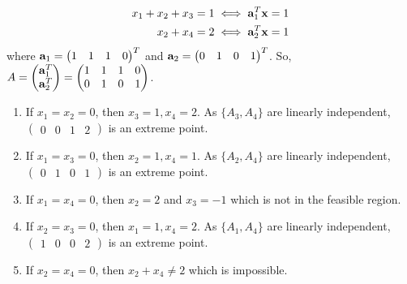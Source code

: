 \begin{enumerate}
\begin{enumerate}[label=(\alph*)]
                    \begin{align*}
                        x_1 + x_2 + x_3 = 1 & \iff \mathbf{a}_1^T \mathbf{x} = 1 \\
                        x_2 + x_4 = 2       & \iff \mathbf{a}_2^T \mathbf{x} = 1
                    \end{align*}
                    where \(\mathbf{a}_1 = \begin{pmatrix}
                        1 & 1 & 1 & 0
                    \end{pmatrix}^T\) and \(\mathbf{a}_2 = \begin{pmatrix}
                        0 & 1 & 0 & 1
                    \end{pmatrix}^T\). So, \(A = \begin{pmatrix}
                        \mathbf{a}_1^T \\ \mathbf{a}_2^T
                    \end{pmatrix} = \begin{pmatrix}
                        1 & 1 & 1 & 0 \\
                        0 & 1 & 0 & 1
                    \end{pmatrix}\).
                    \begin{enumerate}
                        \item If \(x_1 = x_2 = 0\), then \(x_3 = 1, x_4 = 2\). As \(\{A_3, A_4\}\) are linearly independent, \(\begin{pmatrix}
                                  0 & 0 & 1 & 2
                              \end{pmatrix}\) is an extreme point.
                        \item If \(x_1 = x_3 = 0\), then \(x_2 = 1, x_4 = 1\). As \(\{A_2, A_4\}\) are linearly independent, \(\begin{pmatrix}
                                  0 & 1 & 0 & 1
                              \end{pmatrix}\) is an extreme point.
                        \item If \(x_1 = x_4 = 0\), then \(x_2 = 2\) and \(x_3 = -1\) which is not in the feasible region.
                        \item If \(x_2 = x_3 = 0\), then \(x_1 = 1, x_4 = 2\). As \(\{A_1, A_4\}\) are linearly independent, \(\begin{pmatrix}
                                  1 & 0 & 0 & 2
                              \end{pmatrix}\) is an extreme point.
                        \item If \(x_2 = x_4 = 0\), then \(x_2 + x_4 \neq 2\) which is impossible.

\end{enumerate}
\end{enumerate}
\end{enumerate}
